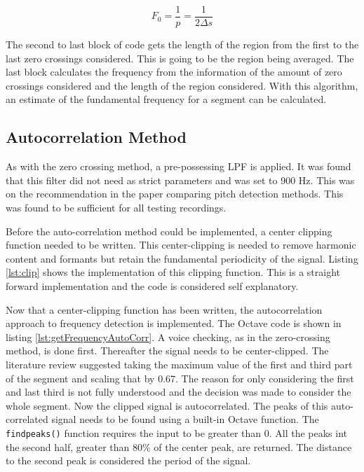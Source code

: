 \begin{equation}\label{eq:PeriodVsFreq1}
	F_0 = \frac{1}{p} = \frac{1}{2\Delta s}
\end{equation}

The second to last block of code gets the length of the region from the first to
the last zero crossings considered. This is going to be the region being averaged.
The last block calculates the frequency from the information of the amount of
zero crossings considered and the length of the region considered. With this
algorithm, an estimate of the fundamental frequency for a segment can be
calculated.

\subsection{Autocorrelation Method}

As with the zero crossing method, a pre-possessing LPF is applied. It was found
that this filter did not need as strict parameters and was set to 900 Hz. This was
on the recommendation in the paper comparing pitch detection
methods\cite{ComparitivePitch}. This was found to be sufficient for all testing
recordings.

Before the auto-correlation method could be implemented, a center clipping
function needed to be written. This center-clipping is needed to remove harmonic
content and formants but retain the fundamental periodicity of the signal. Listing
\ref{lst:clip} shows the implementation of this clipping function. This is a
straight forward implementation and the code is considered self explanatory.


Now that a center-clipping function has been written, the autocorrelation approach
to frequency detection is implemented. The Octave code is shown in listing
\ref{lst:getFrequencyAutoCorr}. A voice checking, as in the zero-crossing method,
is done first. Thereafter the signal needs to be center-clipped. The literature
review suggested taking the maximum value of the first and third part of the
segment and scaling that by 0.67. The reason for only considering the first and
last third is not fully understood and the decision was made to consider the whole
segment. Now the clipped signal is autocorrelated. The peaks of this
auto-correlated signal needs to be found using a built-in Octave function. The
\colorbox{backcolour}{\lstinline{findpeaks()}} function requires the input to be
greater than 0. All the peaks int the second half, greater than 80\% of the center
peak, are returned.  The distance to the second peak is considered the period of
the signal.

